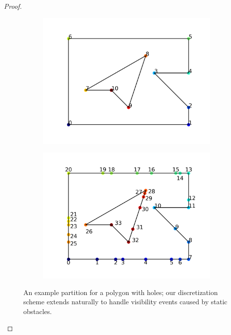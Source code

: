 \documentclass[]{styles/svproc}  %
\begin{document}
\begin{proof}
%
%
\begin{figure}
\centering
\begin{subfigure}{0.5\textwidth}
\centering
\includegraphics[width=0.8\linewidth]{figures/median_holes.png}
\centering
\end{subfigure}%
\begin{subfigure}{0.5\textwidth}
\centering
\includegraphics[width=0.8\linewidth]{figures/median_holes_inserted.png}
\centering
\end{subfigure}
\caption{An example partition for a polygon with holes; our discretization
scheme extends naturally to handle visibility events caused by static obstacles.}
\label{fig:bvd_holes}
\end{figure}


\end{proof}
\end{document}

